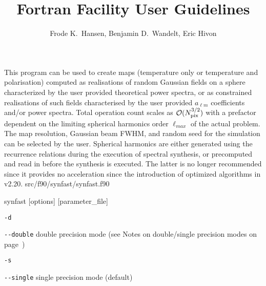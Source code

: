 
\sloppy


\title{\healpix Fortran Facility User Guidelines}
 \section[synfast]{\nosectionname}
\label{fac:synfast}
\author{Frode K.~Hansen, Benjamin D.~Wandelt, Eric Hivon}

\begin{facility}
{This program can be used to create  \healpix maps (temperature only
or temperature and polarisation)  computed as realisations 
of random Gaussian
fields on a sphere characterized by the user provided 
theoretical power spectra,
or as constrained realisations of such fields characterised by the user
provided $a_{\ell m}$ coefficients and/or power spectra.
Total operation count scales as
 ${\cal {O}}(N_{\rm pix}^{3/2})$ with a prefactor dependent on the limiting spherical harmonics
order $\ell_{max}$ of the actual problem. 
The map resolution, Gaussian beam FWHM,  
and random seed for the simulation can be selected by the user.
Spherical harmonics are either generated using the recurrence relations
during the execution of spectral synthesis, or  precomputed and read in
before the synthesis is executed. The latter is no longer recommended since
it provides no acceleration since the introduction of optimized algorithms
in \healpix v2.20. }
{src/f90/synfast/synfast.f90}
\end{facility}

\begin{f90facility}
{synfast [options] [parameter\_file]}
\end{f90facility}

\begin{options}
  \begin{optionlistwide}{} %
    \item[{\tt -d}]
    \item[{\tt -}{\tt -}{\tt double}] double precision mode (see Notes on double/single precision modes on page~\pageref{page:ioprec})
    \item[{\tt -s}]
    \item[{\tt -}{\tt -}{\tt single}] single precision mode (default)
  \end{optionlistwide}
\end{options}

